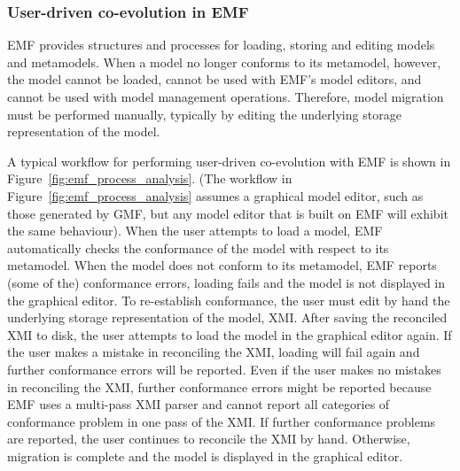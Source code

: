\subsubsection{User-driven co-evolution in EMF}
EMF provides structures and processes for loading, storing and editing models and metamodels. When a model no longer conforms to its metamodel, however, the model cannot be loaded, cannot be used with EMF's model editors, and cannot be used with model management operations. Therefore, model migration must be performed manually, typically by editing the underlying storage representation of the model.

A typical workflow for performing user-driven co-evolution with EMF is shown in Figure~\ref{fig:emf_process_analysis}. (The workflow in Figure~\ref{fig:emf_process_analysis} assumes a graphical model editor, such as those generated by GMF, but any model editor that is built on  EMF will exhibit the same behaviour). When the user attempts to load a model, EMF automatically checks the conformance of the model with respect to its metamodel. When the model does not conform to its metamodel, EMF reports (some of the) conformance errors, loading fails and the model is not displayed in the graphical editor. To re-establish conformance, the user must edit by hand the underlying storage representation of the model, XMI. After saving the reconciled XMI to disk, the user attempts to load the model in the graphical editor again. If the user makes a mistake in reconciling the XMI, loading will fail again and further conformance errors will be reported. Even if the user makes no mistakes in reconciling the XMI, further conformance errors might be reported because EMF uses a multi-pass XMI parser and cannot report all categories of conformance problem in one pass of the XMI. If further conformance problems are reported, the user continues to reconcile the XMI by hand. Otherwise, migration is complete and the model is displayed in the graphical editor. 

